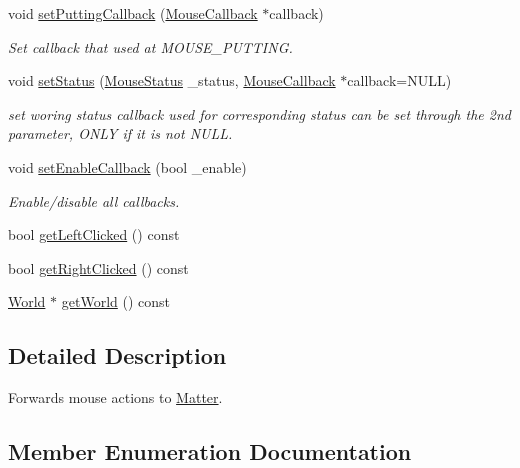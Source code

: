 \begin{DoxyCompactItemize}
void \hyperlink{classMouseHandler_a8b2e24e7199d4a33562c87b50f135fb2}{set\+Putting\+Callback} (\hyperlink{classMouseCallback}{Mouse\+Callback} $\ast$callback)
\begin{DoxyCompactList}\small\item\em Set callback that used at M\+O\+U\+S\+E\+\_\+\+P\+U\+T\+T\+I\+N\+G. \end{DoxyCompactList}\item 
void \hyperlink{classMouseHandler_a8f252c03ffcfe43b09086a9f5201792b}{set\+Status} (\hyperlink{classMouseHandler_af967315727aa1d435d55cc704e64fd1a}{Mouse\+Status} \+\_\+status, \hyperlink{classMouseCallback}{Mouse\+Callback} $\ast$callback=N\+U\+L\+L)
\begin{DoxyCompactList}\small\item\em set woring status callback used for corresponding status can be set through the 2nd parameter, O\+N\+L\+Y if it is not N\+U\+L\+L. \end{DoxyCompactList}\item 
void \hyperlink{classMouseHandler_a3a64869cf23c6d979ce6ac4a0127a93e}{set\+Enable\+Callback} (bool \+\_\+enable)
\begin{DoxyCompactList}\small\item\em Enable/disable all callbacks. \end{DoxyCompactList}\item 
bool \hyperlink{classMouseHandler_ae0bda6b1555601ea331951e813848260}{get\+Left\+Clicked} () const 
\item 
bool \hyperlink{classMouseHandler_ac94dc769799b712128bc6af848d187e3}{get\+Right\+Clicked} () const 
\item 
\hyperlink{classWorld}{World} $\ast$ \hyperlink{classMouseHandler_a35f26398677136e135a72286f40e7f61}{get\+World} () const 
\end{DoxyCompactItemize}


\subsection{Detailed Description}
Forwards mouse actions to \hyperlink{classMatter}{Matter}. 

\subsection{Member Enumeration Documentation}
\hypertarget{classMouseHandler_af967315727aa1d435d55cc704e64fd1a}{}
